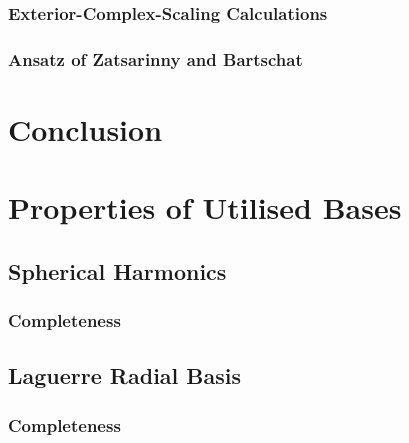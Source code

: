 \documentclass[draft]{article}
\begin{document}
\subsubsection{Exterior-Complex-Scaling Calculations}
\label{sec:e-he-ecs-calculations}

\subsubsection{Ansatz of Zatsarinny and Bartschat}
\label{sec:e-he-ecs-calculations}

\section{Conclusion}
\label{sec:conclusion}

\clearpage





\clearpage

\appendix

\section{Properties of Utilised Bases}
\label{app:properties}

\subsection{Spherical Harmonics}
\label{app:spherical-harmonics}

\subsubsection{Completeness}
\label{app:spherical-harmonic-completeness}


\subsection{Laguerre Radial Basis}
\label{app:laguerre-radial-basis}

\subsubsection{Completeness}
\label{app:laguerre-radial-completeness}
\end{document}

